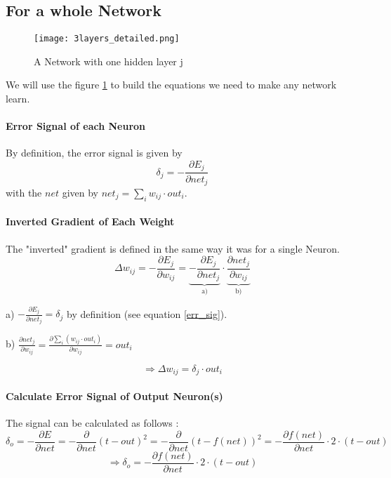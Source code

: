 \documentclass[10pt,a4paper]{article}
\begin{document}
\newpage
\subsection{For a whole Network}

\begin{figure}[h] %
\centering
\texttt{[image: 3layers\_detailed.png]}
\caption{A Network with one hidden layer j}
\label{ref_nn}
\end{figure}

We will use the figure \ref{ref_nn} to build the equations we need to make any network learn. 
\paragraph{Error Signal of each Neuron} By definition, the error signal is given by
\begin{equation}\label{err_sig}
\delta_j = -\frac{\partial E_j}{\partial net_j}
\end{equation}
with the $net$ given by $net_j = \sum_{i}{w_{ij} \cdot out_i}$.

\paragraph{Inverted Gradient of Each Weight} The "inverted" gradient is defined in the same way it was for a single Neuron. 
$$
\Delta w_{ij} = -\frac{\partial E_j}{\partial w_{ij}}
			  = \underbrace{-\frac{\partial E_j}{\partial net_j}}_{\text{a)}} \cdot 
			    \underbrace{\frac{\partial net_j}{\partial w_{ij}}}_{\text{b)}}
$$
\begin{list}{}{}
\item a) $ -\frac{\partial E_j}{\partial net_j} = \delta_j $ by definition (see equation \ref{err_sig}). 
\item b) $ \frac{\partial net_j}{\partial w_{ij}} = \frac{\partial \sum_{i}{(w_{ij} \cdot out_i)}}{\partial w_{ij}} = out_i$
\end{list}

\begin{equation}\label{inv_grad}
\Rightarrow \boxed{\Delta w_{ij} = \delta_j \cdot out_i}
\end{equation}

\paragraph{Calculate Error Signal of Output Neuron(s)} The signal can be calculated as follows : 
$$
\delta_o = - \frac{\partial E}{\partial net} 
		 = - \frac{\partial}{\partial net}(t - out)^2
		 = - \frac{\partial}{\partial net}(t - f(net))^2
		 = - \frac{\partial f(net)}{\partial net} \cdot 2 \cdot (t - out)
$$
\begin{equation}\label{err_sig_o}
\Rightarrow \boxed{\delta_o = - \frac{\partial f(net)}{\partial net} \cdot 2 \cdot (t - out)}
\end{equation}
\end{document}
